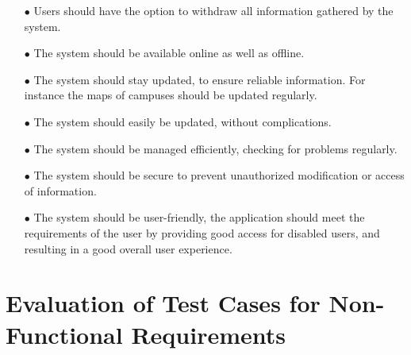 \documentclass[english]{article}
\begin{document}
\begin{itemize}
\item[$\bullet$]Users should have the option to withdraw all information gathered by the system.

\item[$\bullet$]The system should be available online as well as offline.

\item[$\bullet$]The system should stay updated, to ensure reliable information. For instance the maps of campuses should be updated regularly.

\item[$\bullet$]The system should easily be updated, without complications.

\item[$\bullet$]The system should be managed efficiently, checking for problems regularly.

\item[$\bullet$]The system should be secure to prevent unauthorized modification or access of information.

\item[$\bullet$]The system should be user-friendly, the application should meet the requirements of the user by providing good access for disabled users, and resulting in a good overall user experience.
\end{itemize}	
	
	\section{Evaluation of Test Cases for Non-Functional Requirements}
\end{document}
